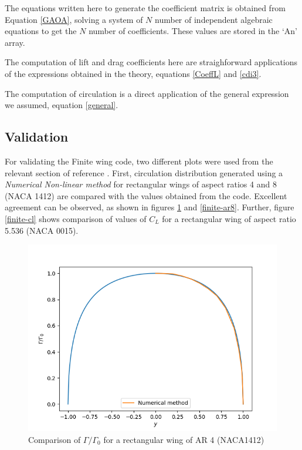 \documentclass[letterpaper,12pt]{article}
\begin{document}


The equations written here to generate the coefficient matrix is obtained from Equation \ref{GAOA}, solving a system of $N$ number of independent algebraic equations to get the $N$ number of coefficients. These values are stored in the `An' array.


The computation of lift and drag coefficients here are straighforward applications of the expressions obtained in the theory, equations \ref{CoeffL} and \ref{cdi3}.

The computation of circulation is a direct application of the general expression we assumed, equation \ref{general}.

\subsection{Validation}
For validating the Finite wing code, two different plots were used from the relevant section of reference \cite{anderson}. First, circulation distribution generated using a \textit{Numerical Non-linear method} for rectangular wings of aspect ratios 4 and 8 (NACA 1412) are compared with the values obtained from the code. Excellent agreement can be observed, as shown in figures \ref{finite-ar4} and \ref{finite-ar8}. Further, figure \ref{finite-cl} shows comparison of values of $C_L$ for a rectangular wing of aspect ratio 5.536 (NACA 0015).

\begin{figure}[H]
\includegraphics[scale=0.8]{finite_gamma_1412_ar4}
\centering
\caption{Comparison of $\Gamma/\Gamma_0$ for a rectangular wing of AR 4 (NACA1412)}
\label{finite-ar4}
\end{figure}
\end{document}
